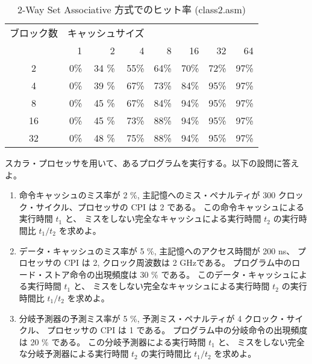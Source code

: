 \documentclass[11pt,dvipdfmx,a4paper]{jsarticle}
\begin{document}
\begin{table}[H]
    \centering
    \caption{2-Way Set Associative 方式でのヒット率 (class2.asm)}
    \label{table:05}
    \begin{tabular}{crrrrrrr}
        \hline
        ブロック数 & \multicolumn{3}{l}{キャッシュサイズ} &    &    &    &     \\
              & 1 & 2  & 4 & 8 & 16 & 32 & 64 \\
              \hline
        2     & 0\% & 34 \% & 55\% & 64\% & 70\% & 72\% & 97\% \\
        4     & 0\% & 39 \% & 67\% & 73\% & 84\% & 95\% & 97\% \\
        8     & 0\% & 45 \% & 67\% & 84\% & 94\% & 95\% & 97\% \\
        16    & 0\% & 45 \% & 73\% & 88\% & 94\% & 95\% & 97\% \\
        32    & 0\% & 48 \% & 75\% & 88\% & 94\% & 95\% & 97\% \\
        \hline
        \end{tabular}
\end{table}




\begin{tcolorbox}[colbacktitle=white, coltitle=black, colback=white, title=課題3]
    スカラ・プロセッサを用いて、あるプログラムを実行する。以下の設問に答えよ。
    \begin{enumerate}
        \item 命令キャッシュのミス率が 2 \%,
        主記憶へのミス・ペナルティが 300 クロック・サイクル、プロセッサの CPI は 2 である。
        この命令キャッシュによる実行時間 \(t_1\) と、
        ミスをしない完全なキャッシュによる実行時間 \(t_2\) の実行時間比 \(t_1/t_2\) を求めよ。
        \item データ・キャッシュのミス率が 5 \%,
        主記憶へのアクセス時間が 200 ns、
        プロセッサの CPI は 2, クロック周波数は 2 GHzである。
        プログラム中のロード・ストア命令の出現頻度は 30 \% である。
        このデータ・キャッシュによる実行時間 \(t_1\) と、
        ミスをしない完全なキャッシュによる実行時間 \(t_2\) の実行時間比 \(t_1/t_2\) を求めよ。
        \item 分岐予測器の予測ミス率が 5 \%,
        予測ミス・ペナルティが 4 クロック・サイクル、
        プロセッサの CPI は 1 である。
        プログラム中の分岐命令の出現頻度は 20 \% である。
        この分岐予測器による実行時間 \(t_1\) と、
        ミスをしない完全な分岐予測器による実行時間 \(t_2\) の実行時間比 \(t_1/t_2\) を求めよ。
    \end{enumerate}
\end{tcolorbox}
\end{document}
